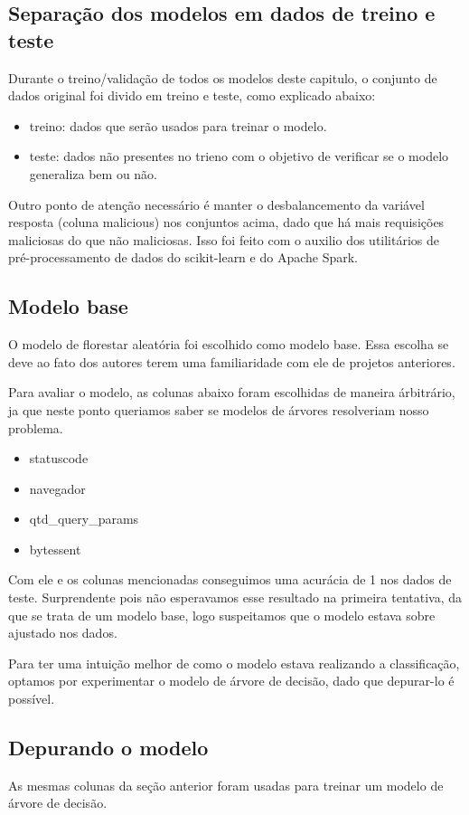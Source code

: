 \subsection{Separação dos modelos em dados de treino e teste}

Durante o treino/validação de todos os modelos deste capitulo, o conjunto de dados original foi divido 
em treino e teste, como explicado abaixo:

\begin{itemize}
    \item treino: dados que serão usados para treinar o modelo.
    \item teste: dados não presentes no trieno com o objetivo de verificar se o modelo generaliza bem ou não.
\end{itemize}

Outro ponto de atenção necessário é manter o desbalancemento da variável resposta (coluna malicious) nos 
conjuntos acima, dado que há mais requisições maliciosas do que não maliciosas. Isso foi feito 
com o auxilio dos utilitários de pré-processamento de dados do scikit-learn e do Apache Spark.

\subsection{Modelo base}

O modelo de florestar aleatória foi escolhido como modelo base. Essa escolha se deve ao fato dos autores 
terem uma familiaridade com ele de projetos anteriores. 

Para avaliar o modelo, as colunas abaixo foram escolhidas de maneira árbitrário, ja que neste ponto 
queriamos saber se modelos de árvores resolveriam nosso problema.

\begin{itemize}
    \item statuscode
    \item navegador
    \item qtd\_query\_params
    \item bytessent
\end{itemize}


Com ele e os colunas mencionadas conseguimos uma acurácia de 1 nos dados de teste. Surprendente pois 
não esperavamos esse resultado na primeira tentativa, da que se trata de um modelo base, logo suspeitamos 
que o modelo estava sobre ajustado nos dados. 

Para ter uma intuição melhor de como o modelo estava realizando a classificação, optamos por experimentar 
o modelo de árvore de decisão, dado que depurar-lo é possível.

\subsection{Depurando o modelo }

As mesmas colunas da seção anterior foram usadas para treinar um modelo de árvore de decisão.